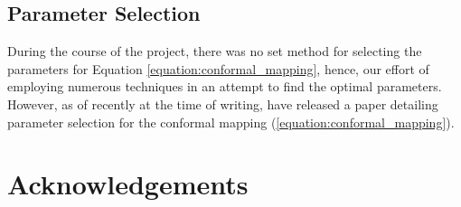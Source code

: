 \documentclass[a4paper]{report}
\begin{document}
\subsection{Parameter Selection}
During the course of the project, there was no set method for selecting the parameters for Equation \ref{equation:conformal_mapping}, hence, our effort of employing numerous techniques in an attempt to find the optimal parameters. However, as of recently at the time of writing, \citet{boyarchenko2024efficient} have released a paper detailing parameter selection for the conformal mapping (\ref{equation:conformal_mapping}).

\section{Acknowledgements}





\begin{appendices}

% 
    
\end{appendices}
\end{document}
